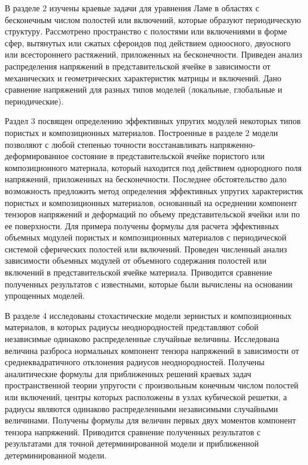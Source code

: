 %
В разделе 2 изучены краевые задачи для уравнения Ламе в областях с бесконечным числом полостей или включений, которые образуют периодическую структуру. Рассмотрено пространство с полостями или включениями в форме сфер, вытянутых или сжатых сфероидов под действием одноосного, двуосного или всестороннего растяжений, приложенных на бесконечности. Приведен анализ распределения напряжений в представительской ячейке в зависимости от механических и геометрических характеристик матрицы и включений. Дано сравнение напряжений для разных типов моделей (локальные, глобальные и периодические).

Раздел 3 посвящен определению эффективных упругих модулей некоторых типов пористых и композиционных материалов. Построенные в разделе 2 модели позволяют с любой степенью точности восстанавливать напряженно-деформированное состояние в представительской ячейке пористого или композиционного материала, который находится под действием однородного поля напряжений, приложенных на бесконечности. Последнее обстоятельство дало возможность предложить метод определения эффективных упругих характеристик пористых и композиционных материалов, основанный на осреднении компонент тензоров напряжений и деформаций по объему представительской ячейки или по ее поверхности. Для примера получены формулы для расчета эффективных объемных модулей пористых и композиционных материалов с периодической системой сферических полостей или включений. Проведен численный анализ зависимости объемных модулей от объемного содержания полостей или включений в представительской ячейке материала. Приводится сравнение полученных результатов с известными, которые были вычислены на основании упрощенных моделей. 

В разделе 4 исследованы стохастические модели зернистых и композиционных материалов, в которых радиусы неоднородностей представляют собой  независимые одинаково распределенные случайные величины. Исследована величина разброса нормальных компонент тензора напряжений в зависимости от среднеквадратичного отклонения радиусов неоднородностей. Получены аналитические формулы для приближенных решений краевых задач пространственной теории упругости с произвольным конечным числом полостей или включений, центры которых расположены в узлах кубической решетки, а радиусы являются одинаково распределенными независимыми случайными величинами. Получены формулы для величин первых двух моментов компонент тензора напряжений. Приводится сравнение полученных результатов с результатами для точной детерминированной модели и приближенной детерминированной модели.

